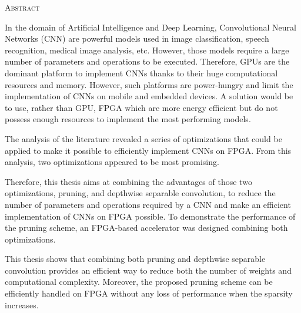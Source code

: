 \vspace*{\fill}

    \begin{center}
    \huge{\textsc{Abstract}}
    \end{center}
    
    In the domain of Artificial Intelligence and Deep Learning, Convolutional Neural Networks (CNN) are powerful models used in image classification, speech recognition, medical image analysis, etc. However, those models require a large number of parameters and operations to be executed. Therefore, GPUs are the dominant platform to implement CNNs thanks to their huge computational resources and memory. However, such platforms are power-hungry and limit the implementation of CNNs on mobile and embedded devices. A solution would be to use, rather than GPU, FPGA which are more energy efficient but do not possess enough resources to implement the most performing models. 
    
    The analysis of the literature revealed a series of optimizations that could be applied to make it possible to efficiently implement CNNs on FPGA. From this analysis, two optimizations appeared to be most promising.

    Therefore, this thesis aims at combining the advantages of those two optimizations, pruning, and depthwise separable convolution, to reduce the number of parameters and operations required by a CNN and make an efficient implementation of CNNs on FPGA possible. To demonstrate the performance of the pruning scheme, an FPGA-based accelerator was designed combining both optimizations.
    
    This thesis shows that combining both pruning and depthwise separable convolution provides an efficient way to reduce both the number of weights and computational complexity. Moreover, the proposed pruning scheme can be efficiently handled on FPGA without any loss of performance when the sparsity increases.

\vspace*{\fill}
\afterpage{\blankpage}
\newpage
